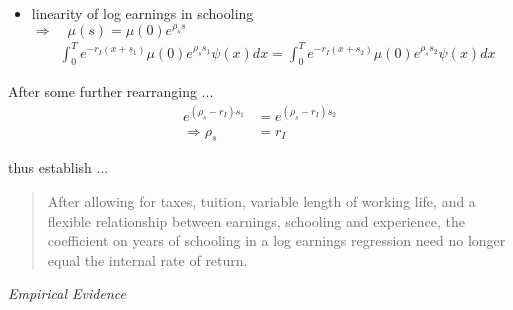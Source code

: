 \begin{frame}
\begin{itemize}
\item linearity of log earnings in schooling \\\vspace{0.3cm}
\hspace{0.3cm}$\Rightarrow\quad \mu(s) = \mu(0)e^{\rho_s s}$\vspace{0.3cm}
\begin{align*}
&\int_{0}^T e^{-r_I(x + s_1)} \mu(0)e^{\rho_s s_1}\psi(x) dx  = \int_{0}^T e^{-r_I(x + s_2)} \mu(0)e^{\rho_s s_2}\psi(x)dx
\end{align*}
\end{itemize}
\end{frame}
\begin{frame}
After some further rearranging ...
\begin{align*}
e^{(\rho_s - r_I)s_1} & = e^{(\rho_s - r_I) s_2} \\
\Rightarrow \rho_s  & = r_I
\end{align*}
\end{frame}
\begin{frame}
 thus establish ... \vspace{0.5cm}

\begin{quote}
After allowing for taxes, tuition, variable length of working life, and a flexible relationship between earnings, schooling and experience, the coefficient on years of schooling in a log earnings regression need no longer equal the internal rate of return.
\end{quote}
\end{frame}
\begin{frame}\begin{center}
\LARGE\textit{Empirical Evidence}
\end{center}\end{frame}
